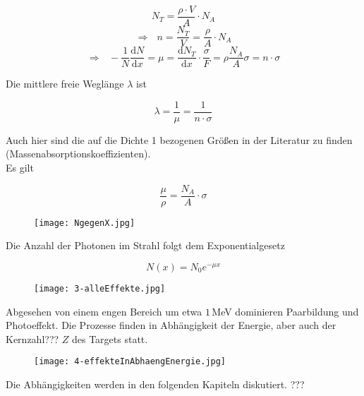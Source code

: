 \[N_T=\frac{\rho\cdot V}{A}\cdot N_A\]
\[\Rightarrow~~~n=\frac{N_T}{V}=\frac{\rho}{A}\cdot N_A\]
\[\Rightarrow~~~-\frac{1}{N}\frac{\mathrm{d}N}{\mathrm{d}x}=\mu=\frac{\mathrm{d}N_T}{\mathrm{d}x}\cdot
\frac{\sigma}{F}=\rho\frac{N_A}{A}\sigma=n\cdot\sigma \]

Die mittlere freie Weglänge $\lambda$ ist

\[ \lambda = \frac{1}{\mu}=\frac{1}{n\cdot \sigma} \]

Auch hier sind die auf die Dichte 1 bezogenen Größen in der Literatur zu finden
(Massenabsorptionskoeffizienten). 
\\
Es gilt

\[ \frac{\mu}{\rho}=\frac{N_A}{A}\cdot \sigma \]

\begin{figure}[H]
	\centering
	\texttt{[image: NgegenX.jpg]}
\end{figure}

Die Anzahl der Photonen im Strahl folgt dem Exponentialgesetz

\[N(x)=N_0 e^{-\mu x} \]

\begin{figure}[H]
	\centering
	\texttt{[image: 3-alleEffekte.jpg]}
\end{figure}

Abgesehen von einem engen Bereich um etwa $1\,$MeV dominieren Paarbildung und Photoeffekt. Die
Prozesse finden in Abhängigkeit der Energie, aber auch der Kernzahl??? $Z$ des Targets statt. 

\begin{figure}[H]
	\centering
	\texttt{[image: 4-effekteInAbhaengEnergie.jpg]}
\end{figure}

Die Abhängigkeiten werden in den folgenden Kapiteln diskutiert. ???

